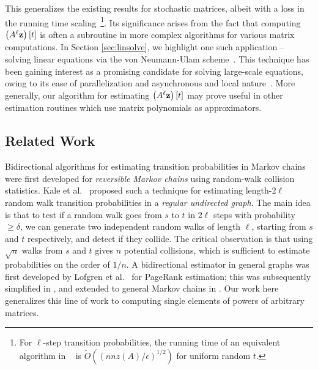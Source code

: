 This generalizes the existing results for stochastic matrices, albeit with a loss in the running time scaling~\footnote{For $\ell$-step transition probabilities, the running time of an equivalent algorithm in ~\cite{banerjee2015fast} is $\widetilde{O}\left(\left(nnz(A)/\epsilon\right)^{1/2}\right)$ for uniform random $t$.}. 
Its significance arises from the fact that computing $\left(A^{\ell}\mathbf{z}\right)[t]$ is often a subroutine in more complex algorithms for various matrix computations.
In Section \ref{sec:linsolve}, we highlight one such application -- solving linear equations via the von Neumann-Ulam scheme~\cite{forsythe1950matrix}. 
This technique has been gaining interest as a promising candidate for solving large-scale equations, owing to its ease of parallelization and asynchronous and local nature~\cite{ji2013convergence,dimov2015new,lee2014asynchronous}. 
More generally, our algorithm for estimating $\left(A^{\ell}\mathbf{z}\right)[t]$ may prove useful in other estimation routines which use matrix polynomials as approximators. 


\subsection{Related Work}

Bidirectional algorithms for estimating transition probabilities in Markov chains were first developed for \emph{reversible Markov chains} using random-walk collision statistics. 
Kale et al.~\cite{Kale2008} proposed such a technique for estimating length-$2\ell$ random walk transition probabilities in a \emph{regular undirected graph}.
The main idea is that to test if a random walk goes from $s$ to $t$ in $2\ell$ steps with probability $\geq\delta$, we can generate two independent random walks of length $\ell$, starting from $s$ and $t$ respectively, and detect if they collide.
The critical observation is that using $\sqrt{n}$ walks from $s$ and $t$ gives $n$ potential collisions, which is sufficient to estimate probabilities on the order of $1/n$.
A bidirectional estimator in general graphs was first developed by Lofgren et al.~\cite{Lofgren2014} for PageRank estimation; this was subsequently simplified in \cite{lofgren2016personalized}, and extended to general Markov chains in \cite{banerjee2015fast}. 
Our work here generalizes this line of work to computing single elements of powers of arbitrary matrices.

